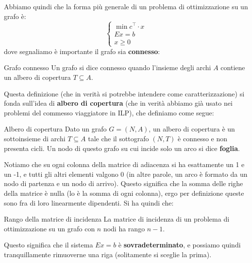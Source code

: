 \documentclass[a4paper,11pt]{article}
\begin{document}
\par\smallskip 

Abbiamo quindi che la forma più generale di un problema di ottimizzazione su un grafo è:
\[
	\begin{cases}
		\min c^\intercal \cdot x \\ 
		Ex = b \\ 
		x \geq 0 
	\end{cases}
\]
dove segnaliamo è importante il grafo sia \textbf{connesso}:
\begin{definition}{Grafo connesso}
	Un grafo si dice connesso quando l'insieme degli archi $A$ contiene un albero di copertura $T \subseteq A$.
\end{definition}
Questa definizione (che in verità si potrebbe intendere come caratterizzazione) si fonda sull'idea di \textbf{albero di copertura} (che in verità abbiamo già usato nei problemi del commesso viaggiatore in ILP), che definiamo come segue:
\begin{definition}{Albero di copertura}
	Dato un grafo $G = (N, A)$, un albero di copertura è un sottoinsieme di archi $T \subseteq A$ tale che il sottografo $(N, T)$ è connesso e non presenta cicli. Un nodo di questo grafo su cui incide solo un arco si dice \textbf{foglia}.
\end{definition}

Notiamo che su ogni colonna della matrice di adiacenza si ha esattamente un 1 e un -1, e tutti gli altri elementi valgono 0 (in altre parole, un arco è formato da un nodo di partenza e un nodo di arrivo).
Questo significa che la somma delle righe della matrice è nulla (lo è la somma di ogni colonna), ergo per definizione queste sono fra di loro linearmente dipendenti.
Si ha quindi che:
\begin{theorem}{Rango della matrice di incidenza}
	La matrice di incidenza di un problema di ottimizzazione su un grafo con $n$ nodi ha rango $n-1$.
\end{theorem}

Questo significa che il sistema $Ex = b$ è \textbf{sovradeterminato}, e possiamo quindi tranquillamente rimuoverne una riga (solitamente si sceglie la prima).
\end{document}
